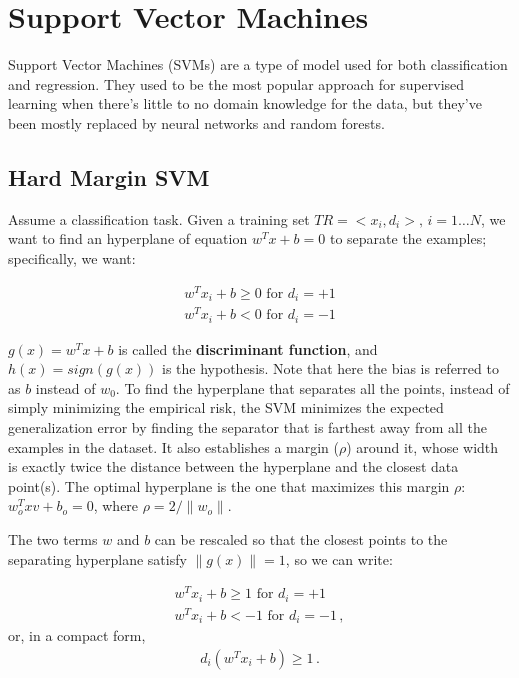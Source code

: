 \chapter{Support Vector Machines}

Support Vector Machines (SVMs) are a type of model used for both classification and regression. They used to be the most popular approach for supervised learning when there's little to no domain knowledge for the data, but they've been mostly replaced by neural networks and random forests.

\section{Hard Margin SVM}

Assume a classification task. Given a training set $TR = <x_i,d_i>, \, i=1 \dots N$, we want to find an hyperplane of equation $w^T x + b = 0$ to separate the examples; specifically, we want:

\begin{gather*}
    w^T x_i + b \geq 0 \text{ for } d_i = +1 \\
    w^T x_i + b < 0 \text{ for } d_i = -1
\end{gather*}

$g(x) = w^T x + b$ is called the \textbf{discriminant function}, and $h(x) = sign(g(x))$ is the hypothesis. Note that here the bias is referred to as $b$ instead of $w_0$. To find the hyperplane that separates all the points, instead of simply minimizing the empirical risk, the SVM minimizes the expected generalization error by finding the separator that is farthest away from all the examples in the dataset. It also establishes a margin ($\rho$) around it, whose width is exactly twice the distance between the hyperplane and the closest data point(s). The optimal hyperplane is the one that maximizes this margin $\rho$: $w_o^Txv + b_o = 0$, where $\rho = 2 / \|w_o\|$.

The two terms $w$ and $b$ can be rescaled so that the closest points to the separating hyperplane satisfy $\|g(x)\| = 1$, so we can write:

\begin{gather*}
    w^T x_i + b \geq 1 \text{ for } d_i = +1 \\
    w^T x_i + b < -1 \text{ for } d_i = -1 \, ,
\end{gather*}
or, in a compact form,
\begin{gather*}
    d_i(w^T x_i + b) \geq 1 \, .
\end{gather*}

